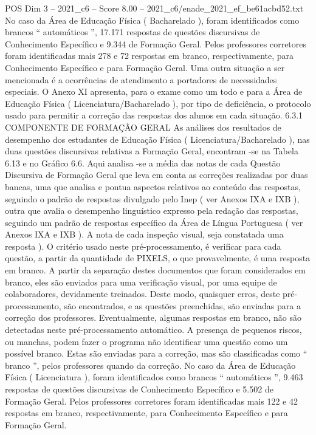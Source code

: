 \begin{textsample}{POS Dim 3 – 2021\_c6 – Score 8.00 – 2021\_c6/enade\_2021\_ef\_be61acbd52.txt}
No caso da Área de Educação Física ( Bacharelado ), foram identificados como brancos “ automáticos ”, 17.171 respostas de questões discursivas de Conhecimento Específico e 9.344 de Formação Geral.
Pelos professores corretores foram identificadas mais 278 e 72 respostas em branco, respectivamente, para Conhecimento Específico e para Formação Geral.
Uma outra situação a ser mencionada é a ocorrências de atendimento a portadores de necessidades especiais.
O Anexo XI apresenta, para o exame como um todo e para a Área de Educação Física ( Licenciatura/Bacharelado ), por tipo de deficiência, o protocolo usado para permitir a correção das respostas dos alunos em cada situação. 6.3.1 COMPONENTE DE FORMAÇÃO GERAL As análises dos resultados de desempenho dos estudantes de Educação Física ( Licenciatura/Bacharelado ), nas duas questões discursivas relativas a Formação Geral, encontram -se na Tabela 6.13 e no Gráfico 6.6.
Aqui analisa -se a média das notas de cada Questão Discursiva de Formação Geral que leva em conta as correções realizadas por duas bancas, uma que analisa e pontua aspectos relativos ao conteúdo das respostas, seguindo o padrão de respostas divulgado pelo Inep ( ver Anexos IXA e IXB ), outra que avalia o desempenho linguístico expresso pela redação das respostas, seguindo um padrão de respostas específico da Área de Língua Portuguesa ( ver Anexos IXA e IXB ).
A nota de cada inspeção visual, seja constatada uma resposta ).
O critério usado neste pré-processamento, é verificar para cada questão, a partir da quantidade de PIXELS, o que provavelmente, é uma resposta em branco.
A partir da separação destes documentos que foram considerados em branco, eles são enviados para uma verificação visual, por uma equipe de colaboradores, devidamente treinados.
Deste modo, quaisquer erros, deste pré-processamento, são encontrados, e as questões preenchidas, são enviadas para a correção dos professores.
Eventualmente, algumas respostas em branco, não são detectadas neste pré-processamento automático.
A presença de pequenos riscos, ou manchas, podem fazer o programa não identificar uma questão como um possível branco.
Estas são enviadas para a correção, mas são classificadas como “ branco ”, pelos professores quando da correção.
No caso da Área de Educação Física ( Licenciatura ), foram identificados como brancos “ automáticos ”, 9.463 respostas de questões discursivas de Conhecimento Específico e 5.502 de Formação Geral.
Pelos professores corretores foram identificadas mais 122 e 42 respostas em branco, respectivamente, para Conhecimento Específico e para Formação Geral.

\end{textsample}
